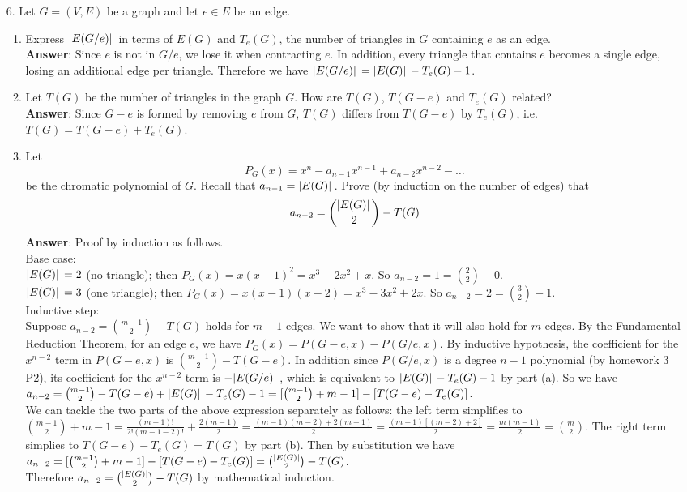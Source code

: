 \documentclass{article}
\begin{document}
\newpage
\begin{itemize}
    \item [6.] Let $G=(V,E)$ be a graph and let $e\in E$ be an edge.
          \begin{enumerate}
              \item Express $\abs*{E(G/e)}$ in terms of $E(G)$ and $T_e(G)$, the number of triangles in $G$ containing $e$ as an edge.\\
                    \textbf{Answer}: Since $e$ is not in $G/e$, we lose it when contracting $e$. In addition, every triangle that contains $e$ becomes a single edge, losing an additional edge per triangle. Therefore we have $\abs*{E(G/e)}=\abs*{E(G)}-T_e(G)-1$.
              \item Let $T(G)$ be the number of triangles in the graph $G$. How are $T(G)$, $T(G-e)$ and $T_e(G)$ related?\\
                    \textbf{Answer}: Since $G-e$ is formed by removing $e$ from $G$, $T(G)$ differs from $T(G-e)$ by $T_e(G)$, i.e. $T(G)=T(G-e)+T_e(G)$.
              \item Let \[P_G(x)=x^n-a_{n-1}x^{n-1}+a_{n-2}x^{n-2}-\ldots\] be the chromatic polynomial of $G$. Recall that $a_{n-1}=\abs*{E(G)}$. Prove (by induction on the number of edges) that \[a_{n-2}=\binom{\abs*{E(G)}}{2}-T(G)\]
                    \textbf{Answer}: Proof by induction as follows.\\
                    Base case:\\$\abs*{E(G)}=2$ (no triangle); then $P_G(x)=x(x-1)^2=x^3-2x^2+x$. So $a_{n-2}=1=\binom{2}{2}-0$.\\
                    $\abs*{E(G)}=3$ (one triangle); then $P_G(x)=x(x-1)(x-2)=x^3-3x^2+2x$. So $a_{n-2}=2=\binom{3}{2}-1$.\\
                        Inductive step:\\
                        Suppose $a_{n-2}=\binom{m-1}{2}-T(G)$ holds for $m-1$ edges. We want to show that it will also hold for $m$ edges. By the Fundamental Reduction Theorem, for an edge $e$, we have $P_G(x)=P(G-e,x)-P(G/e,x)$. By inductive hypothesis, the coefficient for the $x^{n-2}$ term in $P(G-e,x)$ is $\binom{m-1}{2}-T(G-e)$. In addition since $P(G/e,x)$ is a degree $n-1$ polynomial (by homework 3 P2), its coefficient for the $x^{n-2}$ term is $-\abs*{E(G/e)}$, which is equivalent to $\abs*{E(G)}-T_e(G)-1$ by part (a). So we have $a_{n-2}=\binom{m-1}{2}-T(G-e)+\abs*{E(G)}-T_e(G)-1=[\binom{m-1}{2}+m-1]-[T(G-e)-T_e(G)]$.\\
                        We can tackle the two parts of the above expression separately as follows: the left term simplifies to $\binom{m-1}{2}+m-1=\frac{(m-1)!}{2!(m-1-2)!}+\frac{2(m-1)}{2}=\frac{(m-1)(m-2)+2(m-1)}{2}=\frac{(m-1)[(m-2)+2]}{2}=\frac{m(m-1)}{2}=\binom{m}{2}$. The right term simplies to $T(G-e)-T_e(G)=T(G)$ by part (b). Then by substitution we have $a_{n-2}=[\binom{m-1}{2}+m-1]-[T(G-e)-T_e(G)]=\binom{\abs*{E(G)}}{2}-T(G)$.\\
                        Therefore $a_{n-2}=\binom{\abs*{E(G)}}{2}-T(G)$ by mathematical induction.
          \end{enumerate}
\end{itemize}
\end{document}
